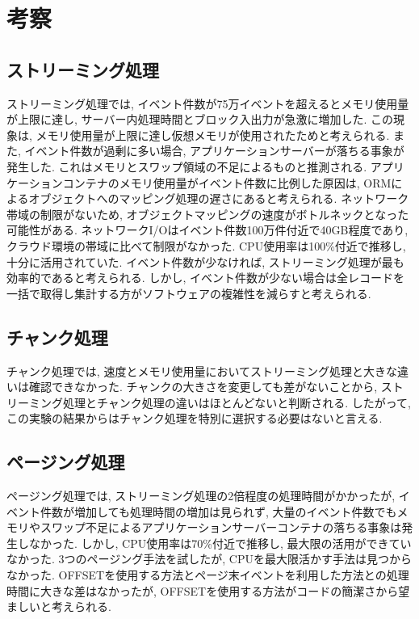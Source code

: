 \documentclass[../../main]{subfiles}
\begin{document}
    \section{考察}\label{sec:consideration}

    \subsection{ストリーミング処理}\label{subsec:consideration-streaming}

    ストリーミング処理では, イベント件数が75万イベントを超えるとメモリ使用量が上限に達し, サーバー内処理時間とブロック入出力が急激に増加した. この現象は, メモリ使用量が上限に達し仮想メモリが使用されたためと考えられる. また, イベント件数が過剰に多い場合, アプリケーションサーバーが落ちる事象が発生した. これはメモリとスワップ領域の不足によるものと推測される. アプリケーションコンテナのメモリ使用量がイベント件数に比例した原因は, ORMによるオブジェクトへのマッピング処理の遅さにあると考えられる. ネットワーク帯域の制限がないため, オブジェクトマッピングの速度がボトルネックとなった可能性がある. ネットワークI/Oはイベント件数100万件付近で40GB程度であり, クラウド環境の帯域に比べて制限がなかった. CPU使用率は100\%付近で推移し, 十分に活用されていた. イベント件数が少なければ, ストリーミング処理が最も効率的であると考えられる. しかし, イベント件数が少ない場合は全レコードを一括で取得し集計する方がソフトウェアの複雑性を減らすと考えられる.

    \subsection{チャンク処理}\label{subsec:consideration-chunk}

    チャンク処理では, 速度とメモリ使用量においてストリーミング処理と大きな違いは確認できなかった. チャンクの大きさを変更しても差がないことから, ストリーミング処理とチャンク処理の違いはほとんどないと判断される. したがって, この実験の結果からはチャンク処理を特別に選択する必要はないと言える.

    \subsection{ページング処理}\label{subsec:consideration-paging}

    ページング処理では, ストリーミング処理の2倍程度の処理時間がかかったが, イベント件数が増加しても処理時間の増加は見られず, 大量のイベント件数でもメモリやスワップ不足によるアプリケーションサーバーコンテナの落ちる事象は発生しなかった. しかし, CPU使用率は70\%付近で推移し, 最大限の活用ができていなかった. 3つのページング手法を試したが, CPUを最大限活かす手法は見つからなかった. OFFSETを使用する方法とページ末イベントを利用した方法との処理時間に大きな差はなかったが, OFFSETを使用する方法がコードの簡潔さから望ましいと考えられる.
\end{document}
